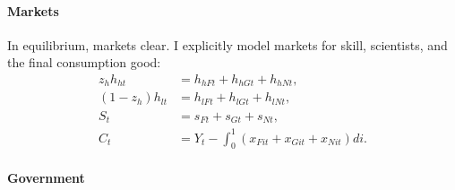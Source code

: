 


  
\paragraph{Markets}
In equilibrium, markets clear. I explicitly model markets for skill, scientists, and the final consumption good:
\begin{align*}
z_h h_{ht}&=h_{hFt}+h_{hGt}+h_{hNt},\\
(1-z_h) h_{lt}&=h_{lFt}+h_{lGt}+h_{lNt},\\
S_t&=s_{Ft}+s_{Gt}+s_{Nt},\\
C_t&=Y_t-\int_{0}^{1}\left(x_{Fit}+x_{Git}+x_{Nit}\right)di.  %
\end{align*}

\paragraph{Government}

